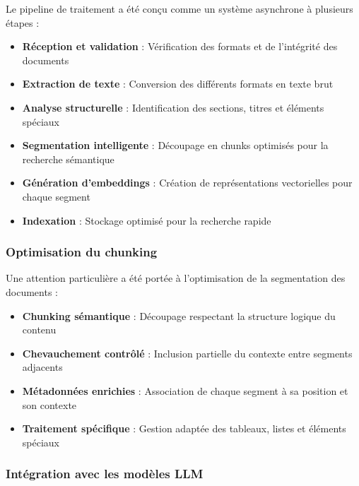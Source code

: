 Le pipeline de traitement a été conçu comme un système asynchrone à plusieurs étapes :

\begin{itemize}
  \item \textbf{Réception et validation} : Vérification des formats et de l'intégrité des documents
  
  \item \textbf{Extraction de texte} : Conversion des différents formats en texte brut
  
  \item \textbf{Analyse structurelle} : Identification des sections, titres et éléments spéciaux
  
  \item \textbf{Segmentation intelligente} : Découpage en chunks optimisés pour la recherche sémantique
  
  \item \textbf{Génération d'embeddings} : Création de représentations vectorielles pour chaque segment
  
  \item \textbf{Indexation} : Stockage optimisé pour la recherche rapide
\end{itemize}

\subsubsection{Optimisation du chunking}

Une attention particulière a été portée à l'optimisation de la segmentation des documents :

\begin{itemize}
  \item \textbf{Chunking sémantique} : Découpage respectant la structure logique du contenu
  
  \item \textbf{Chevauchement contrôlé} : Inclusion partielle du contexte entre segments adjacents
  
  \item \textbf{Métadonnées enrichies} : Association de chaque segment à sa position et son contexte
  
  \item \textbf{Traitement spécifique} : Gestion adaptée des tableaux, listes et éléments spéciaux
\end{itemize}

\subsubsection{Intégration avec les modèles LLM}

